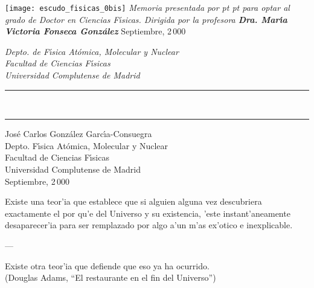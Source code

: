 \thispagestyle{empty}  

\mbox{} \vskip 20pt

\begin{center}
  {\Huge \sffamily \bfseries \sc \mititulo}
  \vskip 20pt
  \texttt{[image: escudo\_fisicas\_0bis]}
  \vskip 20pt
  {\large \itshape
    Memoria presentada por   pt
    {\Large \bfseries \rm \yo}   pt
    para optar al grado de Doctor en Ciencias F{\'{\i}}sicas. \vskip 40pt
    Dirigida por la profesora \vskip 25pt
    {\Large \bfseries \rm Dra. Mar{\'{\i}}a Victoria Fonseca Gonz{\'{a}}lez}
    } \vskip 35pt
  {\Large \rm Septiembre, 2\,000 \\} \vskip 35pt
  
  {\it \small
    Depto. de F{\'{\i}}sica At{\'{o}}mica, Molecular y Nuclear\\
    Facultad de Ciencias F{\'{\i}}sicas\\
    Universidad Complutense de Madrid\\
    }  
\end{center}

\echapter %

\thispagestyle{empty}  

\vspace*{2cm}
\begin{flushright}
  \rule{.7\linewidth}{1pt}\\
  \Large \mititulo
  \rule{.7\linewidth}{1pt}
\end{flushright}
\vspace*{6cm}
\begin{flushright}
  \large 
Jos{\'{e}} Carlos Gonz{\'{a}}lez Garc{\'{\i}}a-Consuegra\\[15 mm]
Depto. F{\'{\i}}sica At{\'{o}}mica, Molecular y Nuclear\\
Facultad de Ciencias F{\'{\i}}sicas\\
Universidad Complutense de Madrid\\[15 mm]
Septiembre, 2\,000
\end{flushright}

\echapter %

\thispagestyle{empty}  

\vspace*{2cm} 
%
\hfill 
\parbox[b]{0.65\linewidth}{ 
%
\itshape
%
\raggedright
%
Existe una teor'ia que establece que si alguien alguna vez descubriera
exactamente el por qu'e del Universo y su existencia, 'este
instant'aneamente desaparecer'ia para ser remplazado por algo a'un
m'as ex'otico e inexplicable. \\
%
\vspace{5pt}
\centerline{---}
\vspace{5pt}
%
Existe otra teor'ia que defiende que eso ya ha ocurrido.\\
%
\vspace{15pt}
%
\upshape
%
\raggedleft
%
{\footnotesize (Douglas Adams, ``El restaurante en el fin del Universo'')}
%
} 

\echapter %

\endinput
%

